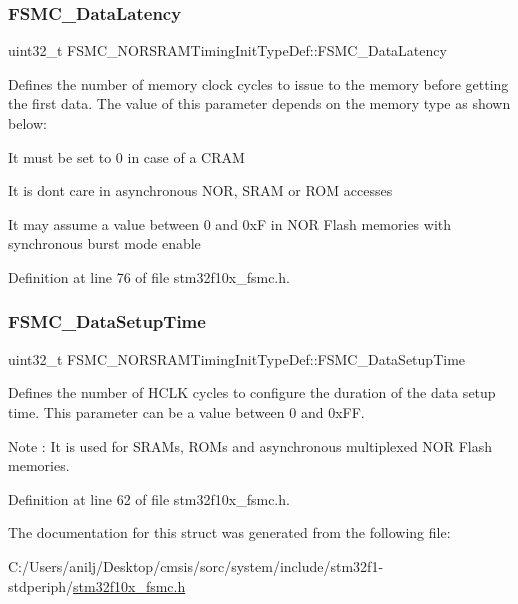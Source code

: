 \subsubsection{\texorpdfstring{F\+S\+M\+C\+\_\+\+Data\+Latency}{FSMC\_DataLatency}}
{\footnotesize\ttfamily uint32\+\_\+t F\+S\+M\+C\+\_\+\+N\+O\+R\+S\+R\+A\+M\+Timing\+Init\+Type\+Def\+::\+F\+S\+M\+C\+\_\+\+Data\+Latency}

Defines the number of memory clock cycles to issue to the memory before getting the first data. The value of this parameter depends on the memory type as shown below\+:
\begin{DoxyItemize}
\item It must be set to 0 in case of a C\+R\+AM
\item It is don\textquotesingle{}t care in asynchronous N\+OR, S\+R\+AM or R\+OM accesses
\item It may assume a value between 0 and 0xF in N\+OR Flash memories with synchronous burst mode enable 
\end{DoxyItemize}

Definition at line 76 of file stm32f10x\+\_\+fsmc.\+h.

\mbox{\label{struct_f_s_m_c___n_o_r_s_r_a_m_timing_init_type_def_aaa0a9178766adeed424d5c4eb728d1b1}} 
\subsubsection{\texorpdfstring{F\+S\+M\+C\+\_\+\+Data\+Setup\+Time}{FSMC\_DataSetupTime}}
{\footnotesize\ttfamily uint32\+\_\+t F\+S\+M\+C\+\_\+\+N\+O\+R\+S\+R\+A\+M\+Timing\+Init\+Type\+Def\+::\+F\+S\+M\+C\+\_\+\+Data\+Setup\+Time}

Defines the number of H\+C\+LK cycles to configure the duration of the data setup time. This parameter can be a value between 0 and 0x\+FF. \begin{DoxyNote}{Note}
\+: It is used for S\+R\+A\+Ms, R\+O\+Ms and asynchronous multiplexed N\+OR Flash memories. 
\end{DoxyNote}


Definition at line 62 of file stm32f10x\+\_\+fsmc.\+h.



The documentation for this struct was generated from the following file\+:\begin{DoxyCompactItemize}
\item 
C\+:/\+Users/anilj/\+Desktop/cmsis/sorc/system/include/stm32f1-\/stdperiph/\hyperlink{stm32f10x__fsmc_8h}{stm32f10x\+\_\+fsmc.\+h}\end{DoxyCompactItemize}
